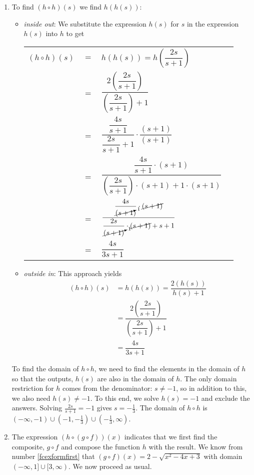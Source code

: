 \begin{ex}
\begin{enumerate}
\item  To find $(h \circ h)(s)$ we find $h(h(s))$:

\begin{itemize}

\item  \textit{inside out}: We substitute the expression $h(s)$ for $s$ in the expression $h(s)$ into $h$ to get
\begin{longtable}{rclr} $(h \circ h)(s)$ & $=$ & $h(h(s)) =h\left(\dfrac{2s}{s+1}\right)$ & \\ [15pt]
&=& $\dfrac{2\left(\dfrac{2s}{s+1}\right)}{\left(\dfrac{2s}{s+1}\right)+1}$ & \\ [25pt]
 & = & $\dfrac{\dfrac{4s}{s+1}}{\dfrac{2s}{s+1}+1} \cdot \dfrac{(s+1)}{(s+1)}$ & \\ [25pt]
& = & $\dfrac{\dfrac{4s}{s+1} \cdot (s+1)}{\left(\dfrac{2s}{s+1}\right)\cdot(s+1)+1\cdot(s+1)}$ & \\ [25pt]
& = & $\dfrac{\dfrac{4s}{\cancelto{1}{(s+1})} \cdot \cancel{(s+1)}}{\dfrac{2s}{\cancelto{1}{(s+1)}}\cdot\cancel{(s+1)}+s+1}$ & \\ [25pt]
& = & $\dfrac{4s}{3s+1}$ & \\ 
 \end{longtable}

\item  \textit{outside in}: This approach yields
\begin{align*}
	(h \circ h)(s) &= h(h(s)) = \dfrac{2 (h(s))}{h(s) + 1} \\
	& = \dfrac{2\left(\dfrac{2s}{s+1}\right)}{\left(\dfrac{2s}{s+1}\right)+1} \\
	& = \dfrac{4s}{3s+1} \tag{same algebra as before}
\end{align*}

\end{itemize}

To find the domain of $h \circ h$,  we need to find the elements in the domain of $h$ so that the outputs, $h(s)$ are also in the domain of $h$.  The only domain restriction for $h$ comes from the denominator: $s \neq -1$, so in addition to this, we also need $h(s) \neq -1$.  To this end, we solve $h(s) = -1$ and exclude the answers.  Solving   $\frac{2s}{s+1} = -1$ gives $s = -\frac{1}{3}$.  The domain of $h \circ h$ is $(-\infty, -1) \cup \left(-1, -\frac{1}{3}\right) \cup \left(-\frac{1}{3}, \infty\right)$. 

\item  The expression $(h \circ (g \circ f))(x)$ indicates that we first find the composite, $g \circ f$ and compose the function $h$ with the result.  We know from number \ref{fcexformfirst} that $(g \circ f)(x) =  2 - \sqrt{x^2-4x+3}$ with domain $(-\infty, 1] \cup [3,\infty)$.  We now proceed as usual.


\end{enumerate}
\end{ex}
